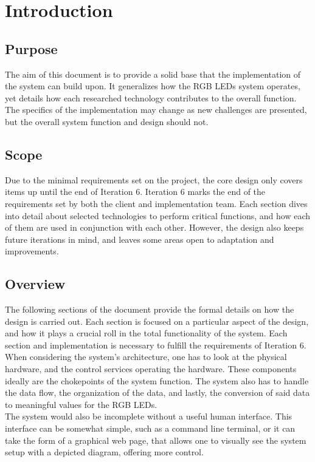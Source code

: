 	\section{Introduction}

		\subsection{Purpose}
		The aim of this document is to provide a solid base that the implementation of the system can build upon. It generalizes how the RGB LEDs system
		operates, yet details how each researched technology contributes to the overall function. The specifics of the implementation may change as new
		challenges are presented, but the overall system function and design should not.

		\subsection{Scope}
		Due to the minimal requirements set on the project, the core design only covers items up until the end of Iteration 6. Iteration 6 marks the end of the
		requirements set by both the client and implementation team. Each section dives into detail	about selected technologies to perform critical functions,
		and how each of them are used in conjunction with each other. However, the design also keeps future iterations in mind, and leaves some areas open to
		adaptation and improvements.

		\subsection{Overview}
		The following sections of the document provide the formal details on how the design is carried out. Each section is focused on a particular aspect of the
		design, and how it plays a crucial roll in the total functionality of the system. Each section and implementation is necessary to fulfill the requirements of
		Iteration 6.\\

		\noindent When considering the system's architecture, one has to look at the physical hardware, and the control services operating the hardware. These components
		ideally are the chokepoints of the system function. The system also has to handle the data flow, the organization of the data, and lastly, the
		conversion of said data to meaningful values for the RGB LEDs.\\

		\noindent The system would also be incomplete without a useful human interface. This interface can be somewhat simple, such as a command line terminal, or it can
		take the form of a graphical web page, that allows one to visually see the system setup with a depicted diagram, offering more control.



